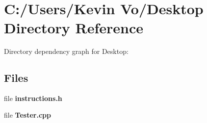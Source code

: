 \section{C\+:/\+Users/\+Kevin Vo/\+Desktop Directory Reference}
\label{dir_e04ae2849dfa520b4ee2c9f7e9ff15de}
Directory dependency graph for Desktop\+:
\subsection*{Files}
\begin{DoxyCompactItemize}
\item 
file {\bfseries instructions.\+h}
\item 
file {\bfseries Tester.\+cpp}
\end{DoxyCompactItemize}
